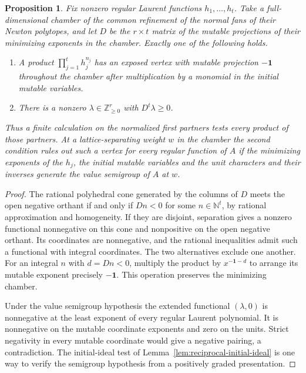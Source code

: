 \documentclass[11pt,reqno]{amsart}
\numberwithin{equation}{section}
\newtheorem{proposition}[theorem]{Proposition}
\theoremstyle{definition}
\theoremstyle{remark}
\begin{document}
\begin{proposition}\label{prop:seed-negative-partners}
Fix nonzero regular Laurent functions \(h_1,\ldots,h_t\). Take a
full-dimensional chamber of the common refinement of the normal fans
of their Newton polytopes, and let \(D\) be the \(r\times t\) matrix
of the mutable projections of their minimizing exponents in the
chamber. Exactly one of the following holds.
\begin{enumerate}
\item A product \(\prod_{j=1}^t h_j^{n_j}\) has an exposed vertex with
mutable projection \(-\mathbf 1\) throughout the chamber after
multiplication by a monomial in the initial mutable variables.
\item There is a nonzero \(\lambda\in\mathbb Z_{\ge0}^r\) with
\(D^t\lambda\ge0\).
\end{enumerate}
Thus a finite calculation on the normalized first partners tests
every product of those partners. At a lattice-separating weight \(w\)
in the chamber the second condition rules out such a vertex for
\emph{every} regular function of \(A\) if the minimizing exponents
of the \(h_j\), the initial mutable variables and the unit characters
and their inverses generate the value semigroup of \(A\) at \(w\).
\end{proposition}
\begin{proof}
The rational polyhedral cone generated by the columns of \(D\) meets
the open negative orthant if and only if \(Dn<0\) for some
\(n\in\mathbb N^t\), by rational approximation and homogeneity.
If they are disjoint, separation gives a nonzero functional
nonnegative on this cone and nonpositive on the open negative
orthant. Its coordinates are nonnegative, and the rational
inequalities admit such a functional with integral coordinates.
The two alternatives exclude one another. For an integral \(n\)
with \(d=Dn<0\), multiply the product by \(x^{-\mathbf1-d}\)
to arrange its mutable exponent precisely \(-\mathbf1\).
This operation preserves the minimizing chamber.

Under the value semigroup hypothesis the extended functional
\((\lambda,0)\) is nonnegative at the least exponent of every
regular Laurent polynomial. It is nonnegative on the mutable
coordinate exponents and zero on the units. Strict negativity in
every mutable coordinate would give a negative pairing, a
contradiction. The initial-ideal test of
Lemma~\ref{lem:reciprocal-initial-ideal} is one way to verify the
semigroup hypothesis from a positively graded presentation.
\end{proof}
\end{document}
